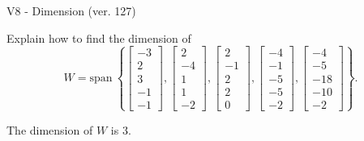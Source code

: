 \begin{exercise}
  \begin{exerciseTitle}V8 - Dimension (ver. 127)\end{exerciseTitle}
  \begin{exerciseStatement}
    Explain how to find the dimension of 
\[W=\mathrm{span}\ \left\{\left[\begin{array}{r}
-3 \\
2 \\
3 \\
-1 \\
-1
\end{array}\right] , \left[\begin{array}{r}
2 \\
-4 \\
1 \\
1 \\
-2
\end{array}\right] , \left[\begin{array}{r}
2 \\
-1 \\
2 \\
2 \\
0
\end{array}\right] , \left[\begin{array}{r}
-4 \\
-1 \\
-5 \\
-5 \\
-2
\end{array}\right] , \left[\begin{array}{r}
-4 \\
-5 \\
-18 \\
-10 \\
-2
\end{array}\right]\right\}.\]



  \end{exerciseStatement}
  \begin{exerciseAnswer}
   The dimension of \(W\) is  \(3\).
  


  \end{exerciseAnswer}
\end{exercise}